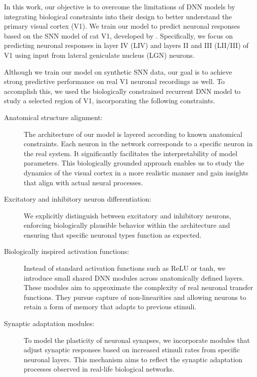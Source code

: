 In this work, our objective is to overcome the limitations of DNN models by
integrating biological constraints into their design to better understand the
primary visual cortex (V1). We train our model
to predict neuronal responses based on the SNN model of cat V1,
developed by \citet{antolik2024comprehensive}. Specifically, we
focus on predicting neuronal responses in layer IV (LIV)
and layers II and III (LII/III) of V1 using input from
lateral geniculate nucleus (LGN) neurons. 

Although we train our model on synthetic SNN data,
our goal is to achieve strong predictive performance on real V1
neuronal recordings as well. To accomplish this, we used the biologically
constrained recurrent DNN model to study a selected region of V1,
incorporating the following constraints.

\begin{description}
\item[Anatomical structure alignment:] The architecture of our
model is layered according to known anatomical constraints. Each
neuron in the network corresponds to a specific neuron in the real
system. It significantly facilitates the interpretability of model
parameters. This biologically grounded approach enables us to study
the dynamics of the visual cortex in a more realistic manner and
gain insights that align with actual neural processes.

\item[Excitatory and inhibitory neuron differentiation:] We explicitly
distinguish between excitatory and inhibitory neurons, enforcing
biologically plausible behavior within the architecture and ensuring
that specific neuronal types function as expected.

\item[Biologically inspired activation functions:] Instead of standard
activation functions such as ReLU or tanh, we introduce small shared
DNN modules across anatomically defined layers. These modules aim to
approximate the complexity of real neuronal transfer functions. They
pursue capture of non-linearities and allowing neurons to retain a form
of memory that adapts to previous stimuli.

\item[Synaptic adaptation modules:] To model the plasticity of neuronal
synapses, we incorporate modules that adjust synaptic responses based on
increased stimuli rates from specific neuronal layers. This mechanism aims
to reflect the synaptic adaptation processes observed in real-life biological
networks.
\end{description}


